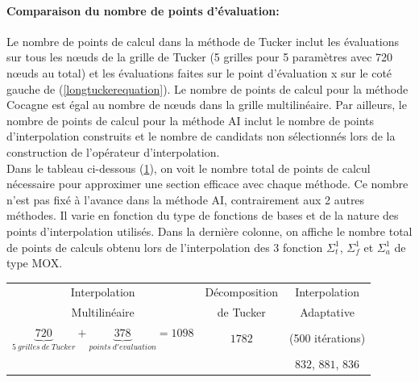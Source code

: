 \paragraph{Comparaison du nombre de points d'évaluation:\\}
\hspace{0.5cm} Le nombre de points de calcul dans la méthode de Tucker inclut les évaluations sur tous les nœuds de la grille de Tucker (5 grilles pour 5 paramètres avec 720 nœuds au total) et les évaluations faites sur le point d'évaluation x sur le coté gauche de (\ref{longtuckerequation}). Le nombre de points de calcul pour la méthode Cocagne est égal au nombre de nœuds dans la grille multilinéaire. Par ailleurs, le nombre de points de calcul pour la méthode AI inclut le nombre de points d'interpolation construits et le nombre de candidats non sélectionnés lors de la construction de l'opérateur d'interpolation.\\
\hspace{0.5cm} Dans le tableau ci-dessous (\ref{table:nbpointscalcul}), on voit le nombre total de points de calcul nécessaire pour approximer une section efficace avec chaque méthode. Ce nombre n'est pas fixé à l'avance dans la méthode AI, contrairement aux 2 autres méthodes. Il varie en fonction du type de fonctions de bases et de la nature des points d'interpolation utilisés. Dans la dernière colonne, on affiche le nombre total de points de calculs obtenu lors de l'interpolation des 3 fonction $\Sigma_t^1$, $\Sigma_f^1$ et $\Sigma_a^1$ de type MOX.
\begin{center}
\begin{table}[!h]
\begin{tabular}{|*{3}{c|}}
	\hline
	Interpolation     																																						& Décomposition  	& Interpolation  			\\
	Multilinéaire																																									& de Tucker				& Adaptative					\\
	\hline
	$\underbrace{720}_{5\ grilles\ de\ Tucker} + \underbrace{378}_{points\ d'evaluation} = 1098$	& $1782$					& 	(500 itérations)  \\
																																																&									&	$832$, $881$, $836$	\\
	\hline
\end{tabular}
\label{table:nbpointscalcul}
\end{table}
\end{center}

